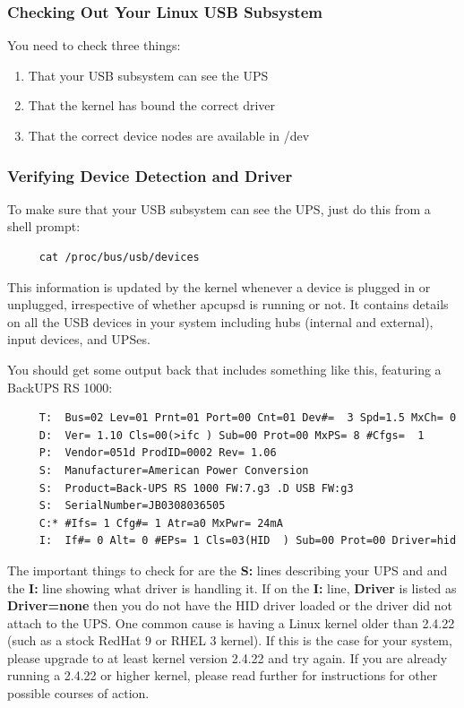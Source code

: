 \label{Checking-Out-Your-Linux-USB-Subsystem}
\subsubsection*{Checking Out Your Linux USB Subsystem}

You need to check three things: 
\begin{enumerate}
   \item That your USB subsystem can see the UPS
   \item That the kernel has bound the correct driver
   \item That the correct device nodes are available in /dev
\end{enumerate}

\subsubsection*{Verifying Device Detection and Driver}

To make sure that your USB subsystem can see the UPS, just do this from a
shell prompt:

\begin{verbatim}
     cat /proc/bus/usb/devices
\end{verbatim}

This information is updated by the kernel whenever a device is plugged in or
unplugged, irrespective of whether apcupsd is running or not. It contains
details on all the USB devices in your system including hubs (internal and
external), input devices, and UPSes.

You should get some output back that includes something like this, featuring
a BackUPS RS 1000: 

\begin{verbatim}
     T:  Bus=02 Lev=01 Prnt=01 Port=00 Cnt=01 Dev#=  3 Spd=1.5 MxCh= 0
     D:  Ver= 1.10 Cls=00(>ifc ) Sub=00 Prot=00 MxPS= 8 #Cfgs=  1
     P:  Vendor=051d ProdID=0002 Rev= 1.06
     S:  Manufacturer=American Power Conversion
     S:  Product=Back-UPS RS 1000 FW:7.g3 .D USB FW:g3
     S:  SerialNumber=JB0308036505
     C:* #Ifs= 1 Cfg#= 1 Atr=a0 MxPwr= 24mA
     I:  If#= 0 Alt= 0 #EPs= 1 Cls=03(HID  ) Sub=00 Prot=00 Driver=hid
\end{verbatim}

The important things to check for are the {\bf S:} lines describing your
UPS and and the {\bf I:} line showing what driver is handling it.
If on the {\bf I:} line, {\bf Driver} is listed as {\bf Driver=none} then
you do not have the HID driver loaded or the driver did not attach to the UPS.
One common cause is having a Linux kernel older than 2.4.22 (such as a stock
RedHat 9 or RHEL 3 kernel). If this is the case for your system, please
upgrade to at least kernel version 2.4.22 and try again. If you are already
running a 2.4.22 or higher kernel, please read further for instructions for
other possible courses of action.  

